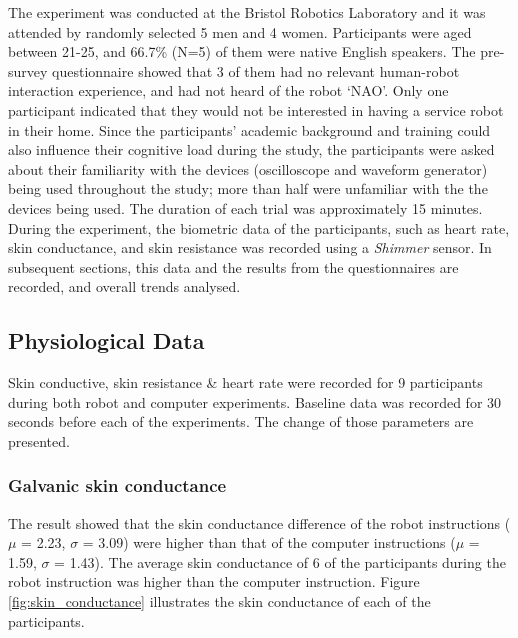 \documentclass[conference]{IEEEtran}
\begin{document}
The experiment was conducted at the Bristol Robotics Laboratory and it was attended by randomly selected 5 men and 4 women. Participants were aged between 21-25, and 66.7\% (N=5) of them were native English speakers. The pre-survey questionnaire showed that 3 of them had no relevant human-robot interaction experience, and had not heard of the robot `NAO'. Only one participant indicated that they would not be interested in having a service robot in their home. Since the participants’ academic background and training could also influence their cognitive load during the study, the participants were asked about their familiarity with the devices (oscilloscope and waveform generator) being used throughout the study; more than half were unfamiliar with the the devices being used. The duration of each trial was approximately 15 minutes. During the experiment, the biometric data of the participants, such as heart rate, skin conductance, and skin resistance was recorded using a \textit{Shimmer} sensor. In subsequent sections, this data and the results from the questionnaires are recorded, and overall trends analysed. 
\subsection{Physiological Data}
Skin conductive, skin resistance \& heart rate were recorded for 9 participants during both robot and computer experiments. Baseline data was recorded for 30 seconds before each of the experiments. The change of those parameters are presented. \newline
\subsubsection{Galvanic skin conductance} The result showed that the skin conductance difference of the robot instructions ($\mu$ = 2.23, $\sigma$ = 3.09) were higher than that of the computer instructions ($\mu$ = 1.59, $\sigma$ = 1.43). The average skin conductance of 6 of the participants during the robot instruction was higher than the computer instruction. Figure \ref{fig:skin_conductance} illustrates the skin conductance of each of the participants.
\end{document}
